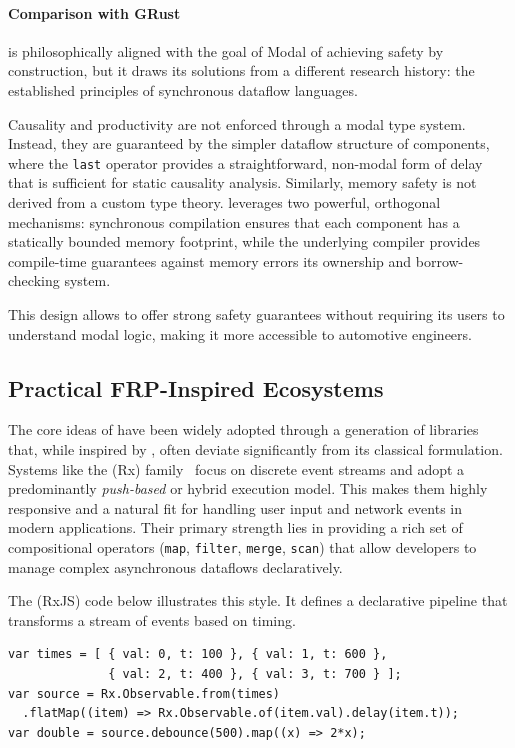 \paragraph*{Comparison with GRust}

\GRust is philosophically aligned with the goal of Modal \frp of achieving safety by construction,
but it draws its solutions from a different research history: the established principles of
synchronous dataflow languages.

Causality and productivity are not enforced through a modal type system. Instead, they are
guaranteed by the simpler dataflow structure of \GRSync components, where the \texttt{last} operator
provides a straightforward, non-modal form of delay that is sufficient for static causality
analysis. Similarly, memory safety is not derived from a custom type theory. \GRust leverages two
powerful, orthogonal mechanisms: synchronous compilation ensures that each component has a
statically bounded memory footprint, while the underlying \Rust compiler provides compile-time
guarantees against memory errors \via its ownership and borrow-checking system.

This design allows \GRust to offer strong safety guarantees without requiring its users to
understand modal logic, making it more accessible to automotive engineers.

\subsection{Practical FRP-Inspired Ecosystems}
\label{sec:sota:frp:practical}

The core ideas of \frp have been widely adopted through a generation of libraries that, while
inspired by \frp, often deviate significantly from its classical formulation. Systems like the
\ReactiveX (Rx) family~\cite{reactivex} focus on discrete event streams and adopt a predominantly
\emph{push-based} or hybrid execution model. This makes them highly responsive and a natural fit for
handling user input and network events in modern applications. Their primary strength lies in
providing a rich set of compositional operators (\eg \texttt{map}, \texttt{filter}, \texttt{merge},
\texttt{scan}) that allow developers to manage complex asynchronous dataflows declaratively.

The \ReactiveX (RxJS) code below illustrates this style. It defines a declarative pipeline that
transforms a stream of events based on timing.

\begin{lstlisting}[basicstyle=\ttfamily\footnotesize\color{BlackText}]
var times = [ { val: 0, t: 100 }, { val: 1, t: 600 },
              { val: 2, t: 400 }, { val: 3, t: 700 } ];
var source = Rx.Observable.from(times)
  .flatMap((item) => Rx.Observable.of(item.val).delay(item.t));
var double = source.debounce(500).map((x) => 2*x);
\end{lstlisting}

